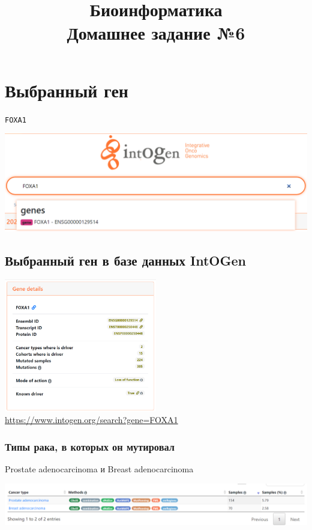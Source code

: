 \documentclass{article}
\title{Биоинформатика \\ Домашнее задание №6}
\begin{document}
  \maketitle

  \section{Выбранный ген}
  \begin{center}
    \LARGE
    \texttt{FOXA1}
  \end{center}

  \noindent
  \includegraphics[width=\textwidth]{FOXA1 search.png}

  \subsection{Выбранный ген в базе данных IntOGen}
  \begin{center}
    \includegraphics[width=0.5\textwidth]{gene details.png}\\
    \url{https://www.intogen.org/search?gene=FOXA1}
  \end{center}

  \subsubsection{Типы рака, в которых он мутировал}
  Prostate adenocarcinoma и Breast adenocarcinoma

  \noindent
  \includegraphics[width=\textwidth]{cancer types.png}
\end{document}
